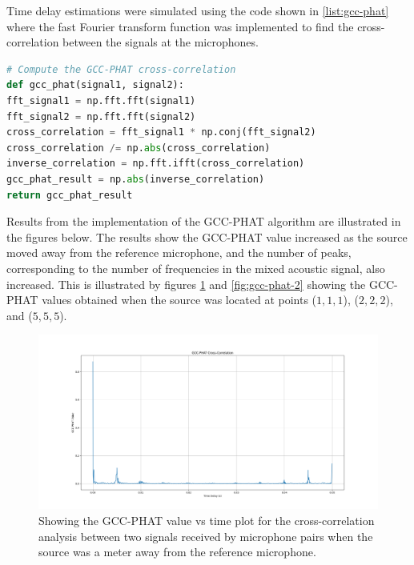 \documentclass[a4paper,11pt]{article}
\begin{document}
Time delay estimations were simulated using the code shown in \ref{list:gcc-phat} where the fast Fourier transform function was implemented to find the cross-correlation between the signals at the microphones.
\begin{lstlisting}[language=Python, caption={Showing implementation of GCC-PHAT algorithm to estimate time delays.}, label=list:gcc-phat]
# Compute the GCC-PHAT cross-correlation
def gcc_phat(signal1, signal2):
fft_signal1 = np.fft.fft(signal1)
fft_signal2 = np.fft.fft(signal2)
cross_correlation = fft_signal1 * np.conj(fft_signal2)
cross_correlation /= np.abs(cross_correlation)
inverse_correlation = np.fft.ifft(cross_correlation)
gcc_phat_result = np.abs(inverse_correlation)
return gcc_phat_result
\end{lstlisting}
Results from the implementation of the GCC-PHAT algorithm are illustrated in the figures below. The results show the GCC-PHAT value increased as the source moved away from the reference microphone, and the number of peaks, corresponding to the number of frequencies in the mixed acoustic signal, also increased. This is illustrated by figures \ref{fig:gcc-phat-1} and \ref{fig:gcc-phat-2} showing the GCC-PHAT values obtained when the source was located at points ($1,1,1$), ($2,2,2$), and ($5,5,5$). 
\begin{figure}[ht!]
	\centering
	\includegraphics[width=1.0\linewidth]{gcc_phat_1.png}
	\caption{Showing the GCC-PHAT value vs time plot for the cross-correlation analysis between two signals received by microphone pairs when the source was a meter away from the reference microphone.}
	\label{fig:gcc-phat-1}
\end{figure}
\end{document}

